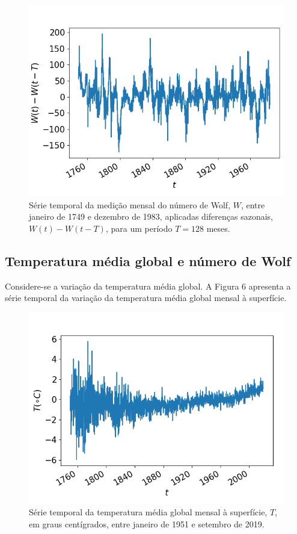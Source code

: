 \documentclass[aps,pre,twocolumn,showpacs,amsmath,amssymb]{revtex4-1}
\begin{document}
\begin{figure}[hbt!]
    \centering
    \includegraphics[width=\columnwidth]{seasonaldifference.png}
    \caption{Série temporal da medição mensal do número de Wolf, $W$, entre janeiro de 1749 e dezembro de 1983, aplicadas diferenças sazonais, $W(t)-W(t-T)$, para um período $T=128$ meses.}
\end{figure}

\subsection{Temperatura média global e número de Wolf}
Considere-se a variação da temperatura média global. A Figura 6 apresenta a série temporal da variação da temperatura média global mensal à superfície.\\

\begin{figure}[hbt!]
    \centering
    \includegraphics[width=\columnwidth]{averageglobaltemperature.png}
    \caption{Série temporal da temperatura média global mensal à superfície, $T$, em graus centígrados, entre janeiro de 1951 e setembro de 2019.}
\end{figure}
\end{document}
